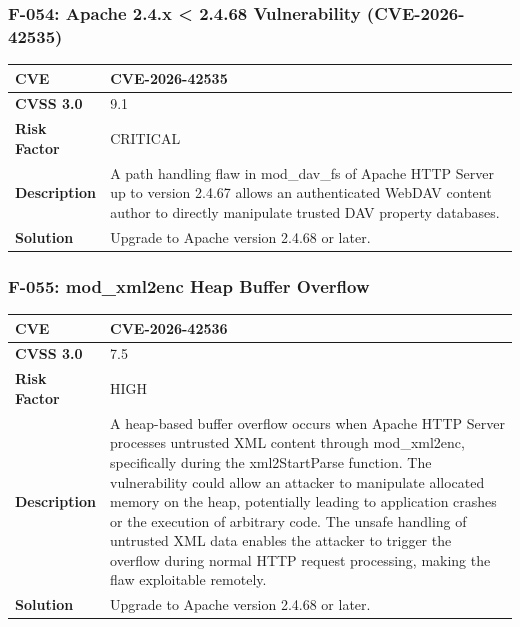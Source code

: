 \subsubsection{F-054: Apache 2.4.x < 2.4.68 Vulnerability (CVE-2026-42535)}
\begin{tabular}{|p{2.8cm}|p{12.2cm}|}
\hline
\textbf{CVE} & CVE-2026-42535 \\ \hline
\textbf{CVSS 3.0} & 9.1 \\ \hline
\textbf{Risk Factor} & CRITICAL \\ \hline
\textbf{Description} & A path handling flaw in mod\_dav\_fs of Apache HTTP Server up to version 2.4.67 allows an authenticated WebDAV content author to directly manipulate trusted DAV property databases. \\ \hline
\textbf{Solution} & Upgrade to Apache version 2.4.68 or later. \\ \hline
\end{tabular}

\subsubsection{F-055: mod\_xml2enc Heap Buffer Overflow}
\begin{tabular}{|p{2.8cm}|p{12.2cm}|}
\hline
\textbf{CVE} & CVE-2026-42536 \\ \hline
\textbf{CVSS 3.0} & 7.5 \\ \hline
\textbf{Risk Factor} & HIGH \\ \hline
\textbf{Description} & A heap-based buffer overflow occurs when Apache HTTP Server processes untrusted XML content through mod\_xml2enc, specifically during the xml2StartParse function. The vulnerability could allow an attacker to manipulate allocated memory on the heap, potentially leading to application crashes or the execution of arbitrary code. The unsafe handling of untrusted XML data enables the attacker to trigger the overflow during normal HTTP request processing, making the flaw exploitable remotely. \\ \hline
\textbf{Solution} & Upgrade to Apache version 2.4.68 or later. \\ \hline
\end{tabular}

